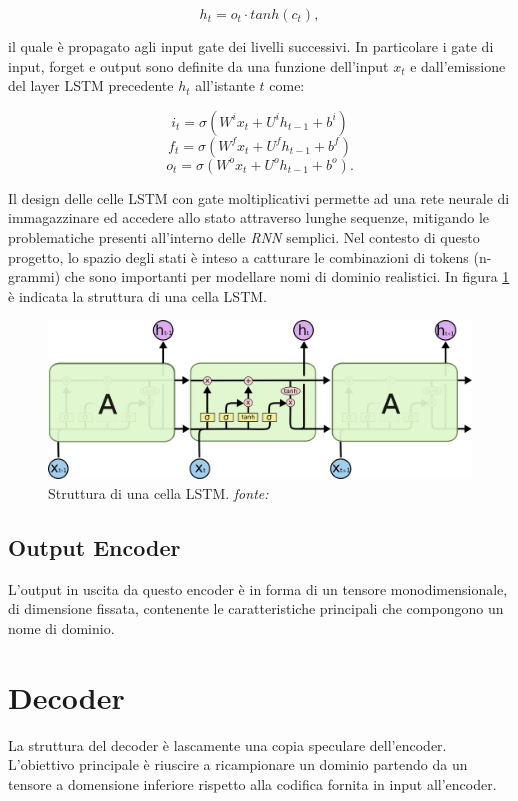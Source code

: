 \[h_t = o_t \cdot tanh(c_t),\]

il quale è propagato agli input gate dei livelli successivi. In particolare i gate di input, forget e output sono definite da una funzione dell'input $x_t$  e dall'emissione del layer LSTM precedente $h_t$ all'istante $t$ come:

\[i_t=\sigma\left(W^ix_t+U^ih_{t-1}+b^i\right)\]
\[f_t=\sigma\left(W^fx_t+U^fh_{t-1}+b^f\right)\]
\[o_t=\sigma\left(W^ox_t+U^oh_{t-1}+b^o\right).\]


Il design delle celle LSTM con gate moltiplicativi permette ad una rete neurale di immagazzinare ed accedere allo stato attraverso lunghe sequenze, mitigando le problematiche presenti all'interno delle \textit{RNN} semplici. Nel contesto di questo progetto, lo spazio degli stati è inteso a catturare le combinazioni di tokens (n-grammi) che sono importanti per modellare nomi di dominio realistici. In figura \ref{fig:lstm} è indicata la struttura di una cella LSTM.

\begin{figure}[htb]
    \centering
	\includegraphics[width=\columnwidth]{figures/LSTM3-chain.png}
	\caption{Struttura di una cella LSTM. \textit{fonte:} \cite{lstmblog} }
\label{fig:lstm}
\end{figure}

\subsection{Output Encoder}
L'output in uscita da questo encoder è in forma di un tensore monodimensionale, di dimensione fissata, contenente le caratteristiche principali che compongono un nome di dominio.

\section{Decoder}
La struttura del decoder è lascamente una copia speculare dell'encoder. L'obiettivo principale è riuscire a ricampionare un dominio partendo da un tensore a domensione inferiore rispetto alla codifica fornita in input all'encoder.

